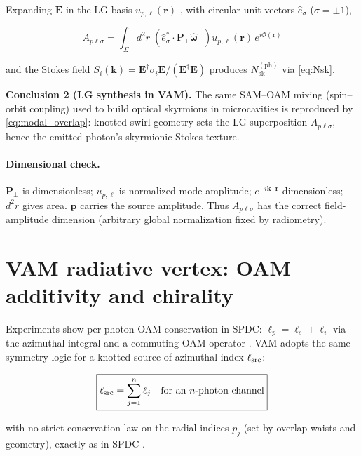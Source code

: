 \documentclass[12pt]{article}
\begin{document}
Expanding $\mathbf{E}$ in the LG basis $u_{p,\ell}(\mathbf{r})$ \cite{Allen1992OAM}, with circular unit vectors $\hat{e}_\sigma$ ($\sigma=\pm 1$),

\begin{equation}
A_{p\ell\sigma} = \int_{\Sigma} d^{2}r \;
\left( \hat{e}_\sigma^* \cdot \mathbf{P}_\perp \hat{\boldsymbol{\omega}}_\perp \right)
u_{p,\ell}(\mathbf{r}) \, e^{i\Phi(\mathbf{r})}
\label{eq:modal_overlap}
\end{equation}

and the Stokes field $S_i(\mathbf{k})=\mathbf{E}^\dagger\sigma_i\mathbf{E}/(\mathbf{E}^\dagger\mathbf{E})$ produces $N_{\mathrm{sk}}^{(\mathrm{ph})}$ via \eqref{eq:Nsk}.

\textbf{Conclusion 2 (LG synthesis in VAM).} The same SAM--OAM mixing (spin--orbit coupling) used to build optical skyrmions in microcavities \cite{Ma2025NanoPhotonSkyrmions,Shen2024NatPhoton} is reproduced by \eqref{eq:modal_overlap}: knotted swirl geometry sets the LG superposition ${A_{p\ell\sigma}}$, hence the emitted photon’s skyrmionic Stokes texture.

\paragraph{Dimensional check.} $\mathbf{P}_\perp$ is dimensionless; $u_{p,\ell}$ is normalized mode amplitude; $e^{-i\mathbf{k}\cdot\mathbf{r}}$ dimensionless; $d^2 r$ gives area. $\mathbf{p}$ carries the source amplitude. Thus $A_{p\ell\sigma}$ has the correct field-amplitude dimension (arbitrary global normalization fixed by radiometry).

\section{VAM radiative vertex: OAM additivity and chirality}

Experiments show per-photon OAM conservation in SPDC: $\ell_p=\ell_s+\ell_i$ via the azimuthal integral and a commuting OAM operator \cite{Kopf2025OAMConservation,Walborn2010SPDCReview}. VAM adopts the same symmetry logic for a knotted source of azimuthal index $\ell_{\rm src}$:

\begin{equation}
\boxed{\ell_{\rm src} = \sum_{j=1}^{n} \ell_j \quad \text{for an $n$-photon channel}}
\label{eq:oam_additivity}
\end{equation}

with no strict conservation law on the radial indices $p_j$ (set by overlap waists and geometry), exactly as in SPDC \cite{Walborn2010SPDCReview}.
\end{document}
